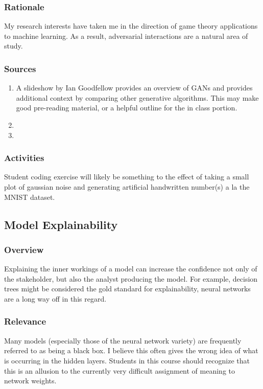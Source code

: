 \documentclass[12pt]{amsart}
\begin{document}
\subsubsection{Rationale}
My research interests have taken me in the direction of game theory applications to machine learning.
As a result, adversarial interactions are a natural area of study.

\subsubsection{Sources}
\begin{enumerate}
	\item A slideshow by Ian Goodfellow \cite{goodfellow2016} provides an overview of GANs and provides
	additional context by comparing other generative algorithms. 
	This may make good pre-reading material, or a helpful outline for the in class portion.
	\item 
	\item 
\end{enumerate}

\subsubsection{Activities}
Student coding exercise will likely be something to the effect of taking a small plot of gaussian noise
and generating artificial handwritten number(s) a la the MNIST dataset.



\subsection{Model Explainability}
\subsubsection{Overview}
Explaining the inner workings of a model can increase the confidence not only of the stakeholder,
but also the analyst producing the model. For example, decision trees might be considered the gold standard
for explainability, neural networks are a long way off in this regard.

\subsubsection{Relevance}
Many models (especially those of the neural network variety) are frequently referred to as being a black box. 
I believe this often gives the wrong idea of what is occurring in the hidden layers.
Students in this course should recognize that this is an allusion to the currently very difficult 
assignment of meaning to network weights.
\end{document}
